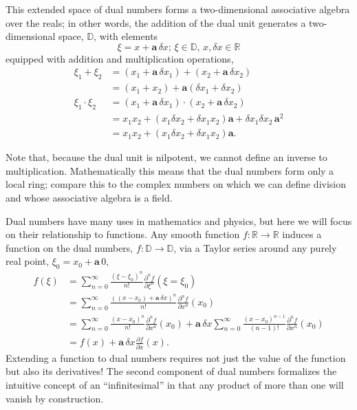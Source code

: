 \documentclass[11pt]{article}
\begin{document}
This extended space of dual numbers forms a two-dimensional associative algebra 
over the reals; in other words, the addition of the dual unit generates a two-dimensional
space, $\mathbb{D}$, with elements
%
\begin{equation*}
\xi = x + \mathbf{a} \, \delta x; \, \xi \in \mathbb{D}, \, x, \delta x \in \mathbb{R}
\end{equation*}
%
equipped with addition and multiplication operations,
%
\begin{align*}
\xi_{1} + \xi_{2} &= \left( x_{1} + \mathbf{a} \, \delta x_{1} \right) + \left( x_{2} + \mathbf{a} \,  \delta x_{2} \right) 
\\
&= \left( x_{1} + x_{2} \right) + \mathbf{a} \left( \delta x_{1} + \delta x_{2} \right) 
\\
\xi_{1} \cdot \xi_{2} 
&= \left( x_{1} + \mathbf{a} \, \delta x_{1} \right) \cdot \left( x_{2} + \mathbf{a} \, \delta x_{2} \right) 
\\
&= x_{1} x_{2} + \left( x_{1} \delta x_{2} + \delta x_{1} x_{2} \right) \mathbf{a} + \delta x_{1} \delta x_{2} \, \mathbf{a}^{2} 
\\
&= x_{1} x_{2} + \left( x_{1} \delta x_{2} + \delta x_{1} x_{2} \right) \mathbf{a}.
\end{align*}  

Note that, because the dual unit is nilpotent, we cannot define an inverse to multiplication.  
Mathematically this means that the dual numbers form only a local ring; compare this to 
the complex numbers on which we can define division and whose associative algebra is a field.

Dual numbers have many uses in mathematics and physics, but here we will focus on their
relationship to functions.  Any smooth function $f : \mathbb{R} \rightarrow \mathbb{R}$ 
induces a function on the dual numbers, $f : \mathbb{D} \rightarrow \mathbb{D}$, 
via a Taylor series around any purely real point, $\xi_{0} = x_{0} + \mathbf{a} \, 0$,
%
\begin{align*}
f \! \left( \xi \right) 
&= 
\sum_{n = 0}^{\infty} \frac{ \left( \xi - \xi_{0} \right)^{n} }{n!} 
\frac{ \partial^{n} f }{ \partial \xi^{n} } \! \left( \xi = \xi_{0} \right) 
\\
&= 
\sum_{n = 0}^{\infty} \frac{ \left( \left( x - x_{0} \right) + \mathbf{a} \, \delta x \right)^{n} }{n!} 
\frac{ \partial^{n} f }{ \partial x^{n} } \! \left( x_{0} \right)
\\
&= 
\sum_{n = 0}^{\infty} \frac{ \left( x - x_{0} \right)^{n} }{n!} 
\frac{ \partial^{n} f }{ \partial x^{n} } \! \left( x_{0} \right)
+ \mathbf{a} \, \delta x \sum_{n = 0}^{\infty} \frac{ \left( x - x_{0} \right)^{n - 1} }{\left( n - 1 \right)!} 
\frac{ \partial^{n} f }{ \partial x^{n} } \! \left( x_{0} \right) 
\\
&= 
f \! \left( x \right) 
+ \mathbf{a} \, \delta x \frac{ \partial f }{ \partial x } \! \left( x \right).
\end{align*}
%
Extending a function to dual numbers requires not just the value of the function
but also its derivatives!  The second component of dual numbers formalizes
the intuitive concept of an ``infinitesimal'' in that any product of more than one
will vanish by construction.
\end{document}
